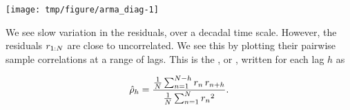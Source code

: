 \begin{frame}[fragile]

\vspace{-3mm}

\begin{knitrout}\small
{}\color{fgcolor}\begin{kframe}
\begin{alltt}
\hlopt{$}
\end{alltt}
\end{kframe}
\end{knitrout}

\begin{knitrout}\small
{}\color{fgcolor}

{\centering \texttt{[image: tmp/figure/arma\_diag-1]} 

}


\end{knitrout}

We see slow variation in the residuals, over a decadal time scale. However, the residuals $r_{1:N}$ are close to uncorrelated. We see this by plotting their pairwise sample correlations at a range of lags. This is the , or , written for each lag $h$ as

\vspace{-2mm}

\begin{equation}
\hat\rho_h = \frac{\frac{1}{N}\sum_{n=1}^{N-h} r_n \, r_{n+h}}{\frac{1}{N}\sum_{n=1}^{N} {r_n}^2}.
\end{equation}

\end{frame}

